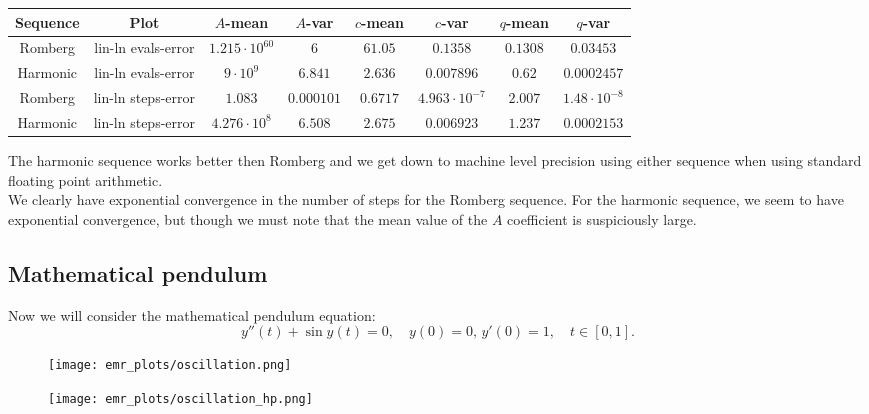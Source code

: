 \begin{table}[H]
    \centering
    \small
     \begin{tabular}{c|c||c|c|c|c|c|c}
Sequence & Plot & \(A\)-mean & \(A\)-var & \(c\)-mean & \(c\)-var & \(q\)-mean & \(q\)-var\\\hline
Romberg & lin-ln evals-error & \(1.215\cdot 10^{60}\) & \(6\) & \(61.05\) & \(0.1358\) & \(0.1308\) & \(0.03453\) \\
Harmonic & lin-ln evals-error & \(9\cdot 10^9\) & \(6.841\) & \(2.636\) & \(0.007896\) & \(0.62\) & \(0.0002457\) \\
Romberg & lin-ln steps-error & \(1.083\) & \(0.000101\) & \(0.6717\) & \(4.963\cdot 10^{-7}\) & \(2.007\) & \(1.48\cdot 10^{-8}\) \\
Harmonic & lin-ln steps-error & \(4.276\cdot 10^8\) & \(6.508\) & \(2.675\) & \(0.006923\) & \(1.237\) & \(0.0002153\) \\
    \end{tabular}
    \label{tab:my_label}
\end{table}

The harmonic sequence works better then Romberg and we get down to machine level precision using either sequence when using standard floating point arithmetic.\\

We clearly have exponential convergence in the number of steps for the Romberg sequence. For the harmonic sequence, we seem to have exponential convergence, but though we must note that the mean value of the \(A\) coefficient is suspiciously large.

\subsection{Mathematical pendulum}

Now we will consider the mathematical pendulum equation:
\begin{equation}
y''(t) + \sin y(t) = 0,\quad y(0) = 0,\, y'(0) = 1, \quad t\in [0,1].
\end{equation}

\begin{figure}[H]
\centering
\begin{minipage}{0.45\textwidth}
\centering
\texttt{[image: emr\_plots/oscillation.png]}
\end{minipage}
\begin{minipage}{0.45\textwidth}
\centering
\texttt{[image: emr\_plots/oscillation\_hp.png]}
\end{minipage}
\end{figure}

